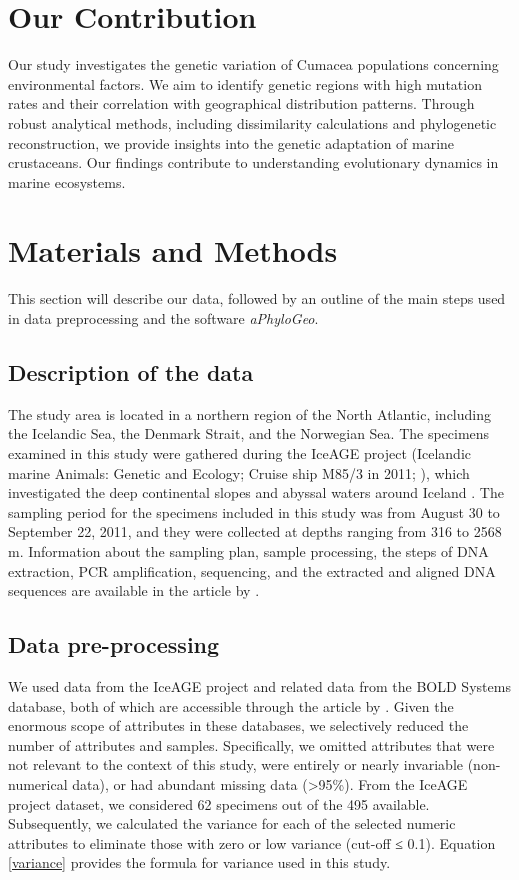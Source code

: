 \section{Our Contribution}

Our study investigates the genetic variation of Cumacea populations concerning environmental factors. We aim to identify genetic regions with high mutation rates and their correlation with geographical distribution patterns. Through robust analytical methods, including dissimilarity calculations and phylogenetic reconstruction, we provide insights into the genetic adaptation of marine crustaceans. Our findings contribute to understanding evolutionary dynamics in marine ecosystems.

\section{Materials and Methods}\label{materials-methods}
This section will describe our data, followed by an outline of the main steps used in data preprocessing and the software \textit{aPhyloGeo}. 

\subsection{Description of the data}
The study area is located in a northern region of the North Atlantic, including the Icelandic Sea, the Denmark Strait, and the Norwegian Sea. The specimens examined in this study were gathered during the IceAGE project (Icelandic marine Animals: Genetic and Ecology; Cruise ship M85/3 in 2011; \cite{brix_iceage_2014}), which investigated the deep continental slopes and abyssal waters around Iceland \citep{meisner_prefacebiodiversity_2018}. The sampling period for the specimens included in this study was from August 30 to September 22, 2011, and they were collected at depths ranging from 316 to 2568 m.  Information about the sampling plan, sample processing, the steps of DNA extraction, PCR amplification, sequencing, and the extracted and aligned DNA sequences are available in the article by \citep{uhlir_adding_2021}.

\subsection{Data pre-processing}
We used data from the IceAGE project and related data from the BOLD Systems database, both of which are accessible through the article by \citep{uhlir_adding_2021}. Given the enormous scope of attributes in these databases, we selectively reduced the number of attributes and samples. Specifically, we omitted attributes that were not relevant to the context of this study, were entirely or nearly invariable (non-numerical data), or had abundant missing data (>95\%). From the IceAGE project dataset, we considered 62 specimens out of the 495 available. Subsequently, we calculated the variance for each of the selected numeric attributes to eliminate those with zero or low variance (cut-off ≤ 0.1). Equation \ref{variance} provides the formula for variance used in this study.

